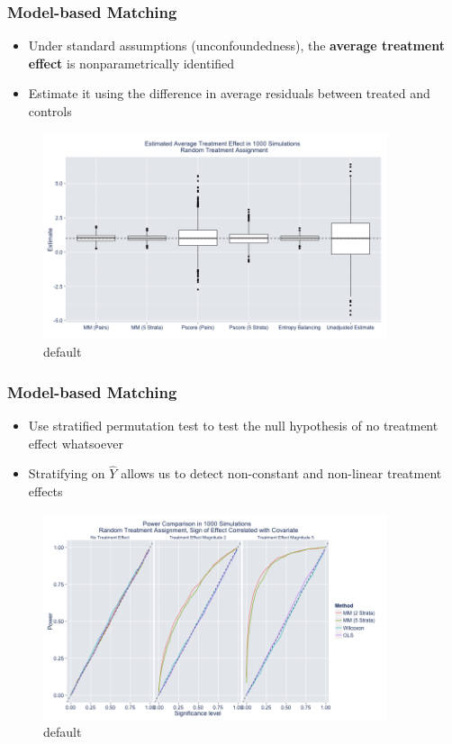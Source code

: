 \documentclass{beamer}
\begin{document}
\frame
{
  \frametitle{Model-based Matching}
\begin{center}
\begin{itemize}
\item Under standard assumptions (unconfoundedness), the \textbf{average treatment effect} is nonparametrically identified
\item Estimate it using the difference in average residuals between treated and controls
\end{itemize}

\begin{figure}[htbp]
\begin{center}
\includegraphics[width = 0.9\textwidth]{fig/estimates.png}
\caption{default}
\label{default}
\end{center}
\end{figure}


\end{center}
}

\frame
{
  \frametitle{Model-based Matching}
\begin{center}
\begin{itemize}
\item Use stratified permutation test to test the null hypothesis of no treatment effect whatsoever
\item Stratifying on $\hat{Y}$ allows us to detect non-constant and non-linear treatment effects
\end{itemize}

\begin{figure}[htbp]
\begin{center}
\includegraphics[width = 0.9\textwidth]{fig/power.png}
\caption{default}
\label{default}
\end{center}
\end{figure}


\end{center}
}
\end{document}
